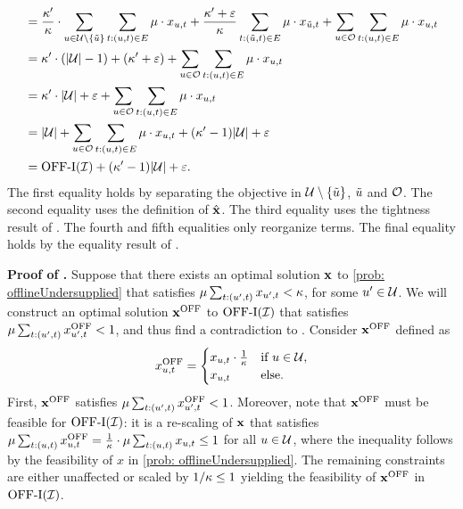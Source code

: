 {\begin{align*}
        &= \frac{\kappa'}{\kappa} \cdot  \sum_{u \in \mathcal U \setminus \{\Tilde{u}\}}\sum_{t: (u, t) \in E} { \mu \cdot x_{u, t}} + \frac{\kappa' + \varepsilon}{\kappa} \sum_{t:(\Tilde{u}, t) \in E} \mu \cdot x_{\Tilde{u}, t} + \sum_{u \in \mathcal O} \sum_{t: (u, t) \in E}{ \mu \cdot x_{u, t}}\\
        &= \kappa' \cdot (|\mathcal U|-1)   + (\kappa' + \varepsilon) + \sum_{u \in \mathcal O} \sum_{t: (u, t) \in E}{ \mu \cdot x_{u, t}}\\
        &= \kappa' \cdot |\mathcal U | + \varepsilon + \sum_{u \in \mathcal O} \sum_{t:  (u, t) \in E}{ \mu \cdot x_{u, t}}\\
        &= |\mathcal U| + \sum_{u \in \mathcal O} \sum_{t:  (u, t) \in E}{ \mu \cdot x_{u, t}} + (\kappa' - 1) |\mathcal U| + \varepsilon\\
        &= \mathrm{\mathrm{OFF}}\textrm{-}\mathrm{I}(\mathcal I) + (\kappa' - 1) |\mathcal U| + \varepsilon.
    \end{align*}
The first equality holds by separating the objective in $\mathcal U \setminus \{ \Tilde{u}\}$, $\Tilde{u}$ and $\mathcal O$. The second equality uses the definition of $\hat{\mathbf{x}}$. The third equality uses the tightness result of . The fourth and fifth equalities only reorganize terms. The final equality holds by the equality result of .
\hfill
\Halmos

\noindent \textbf{Proof of  .}
    Suppose that there exists an optimal solution $\mathbf{x}$ to \ref{prob: offlineUndersupplied} that satisfies $\mu \sum_{t: (u',t)} x_{u',t} < \kappa$, for some $u' \in \mathcal U$. We will construct an optimal solution $\mathbf{x}^{\mathrm{OFF}}$ to $\mathrm{\mathrm{OFF}}\textrm{-}\mathrm{I}(\mathcal I)$ that satisfies $\mu \sum_{t: (u',t)} x^{\mathrm{OFF}}_{u',t} < 1$, {and thus find a contradiction to .}     
    Consider $\mathbf{x}^{\mathrm{OFF}}$ defined as
    \begin{equation*}
        x^{\mathrm{OFF}}_{u,t} = \begin{cases}
            x_{u,t} \cdot \frac{1}{\kappa} & \text{if $u \in \mathcal U$},\\
            x_{u,t} & \text{else.}
            \end{cases}
    \end{equation*}
    {First, $\mathbf{x}^{\mathrm{OFF}}$ satisfies $\mu \sum_{t: (u',t)} x^{\mathrm{OFF}}_{u',t} < 1$. Moreover, note} that $\mathbf{x}^{\mathrm{OFF}}$ must be feasible for $\mathrm{\mathrm{OFF}}\textrm{-}\mathrm{I}(\mathcal I)$: 
    it is a re-scaling of $\mathbf{x}$ that satisfies $\mu \sum_{t: (u,t)} x^{\mathrm{OFF}}_{u,t} = \frac{1}{\kappa} \cdot \mu \sum_{t: (u,t)} x_{u,t}  \leq 1$ for all $u \in \mathcal U$, where the inequality follows by the feasibility of $x$ in \ref{prob: offlineUndersupplied}. %
    {The remaining constraints are either unaffected or} %
    scaled by $1/\kappa \leq 1$ yielding the feasibility of $\mathbf{x}^{\mathrm{OFF}}$ in $\mathrm{\mathrm{OFF}}\textrm{-}\mathrm{I}(\mathcal I)$. 

}
